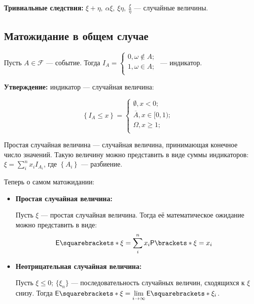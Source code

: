 \textbf{Тривиальные следствия:} $\xi + \eta,\ \alpha\xi,\ \xi\eta,\ \frac{\xi}{\eta}$ --- случайные
величины.

\subsection{Матожидание в общем случае}

\begin{definition}
    Пусть $A\in \mathcal{F}$ --- событие. Тогда $I_A = \begin{cases}
        0, \omega \not \in A;\\
        1, \omega \in A;\\
    \end{cases}$ --- индикатор.
\end{definition}

\textbf{Утверждение:} индикатор --- случайная величина:

\[
    \left\{ I_A \leq x \right\} = \begin{cases}
        \emptyset, x < 0;\\
        \overline{A}, x \in [0, 1);\\
        \Omega, x \geq 1;\\
    \end{cases}
\]

\begin{definition}
    Простая случайная величина --- случайная величина, принимающая конечное число значений. Такую величину
    можно представить в виде суммы индикаторов: $\xi = \sum\limits_{i}^{n}x_i I_{A_i}$, где $\left\{ A_i
    \right\}$ --- разбиение.
\end{definition}

Теперь о самом матожидании:

\begin{itemize}
    \item \textbf{Простая случайная величина:}

        Пусть $\xi$ --- простая случайная величина. Тогда её математическое ожидание можно представить в
        виде:
        \[
            \E{\xi} = \sum\limits_{i}^{n} x_i \Pr{\xi = x_i}
        \]

    \item \textbf{Неотрицательная случайная величина:}

        Пусть $\xi \leq 0$; $\{\xi_n\}$ --- последовательность случайных величин, сходящихся к $\xi$ снизу.
        Тогда $\E{\xi} = \lim\limits_{i \to \infty} \E{\xi_i}$.
\end{itemize}